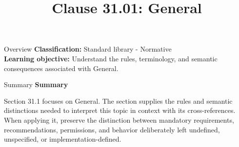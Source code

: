 \documentclass[10pt,letterpaper]{article}
\title{Clause 31.01: General}
\author{}
\date{}
\begin{document}
\maketitle
\begin{CornellOverviewBox}{Overview}
\textbf{Classification:} Standard library - Normative\\[2pt]
\textbf{Learning objective:} Understand the rules, terminology, and semantic consequences associated with General.
\end{CornellOverviewBox}\begin{CornellSummaryBox}{Summary}
{\sffamily\bfseries\color{Accent} Summary}\par\vspace{3pt}Section 31.1 focuses on General. The section supplies the rules and semantic distinctions needed to interpret this topic in context with its cross-references. When applying it, preserve the distinction between mandatory requirements, recommendations, permissions, and behavior deliberately left undefined, unspecified, or implementation-defined.
\end{CornellSummaryBox}
\end{document}
